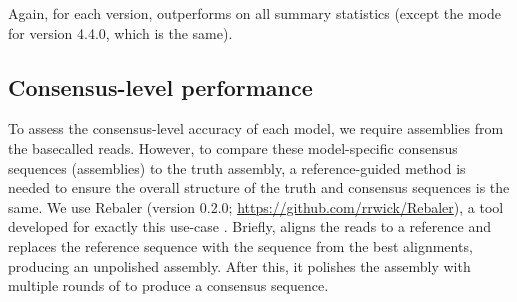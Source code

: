 Again, for each version, \tubby{} outperforms \guppy{} on all summary statistics (except the mode for version 4.4.0, which is the same).

\begin{table}
\centering
{}
\caption{Read BLAST identity summary statistics for the \mtb{}-specific basecalling model \tubby{} compared with the default \guppy{} model on the test data. Version indicates the \guppy{} version used for the basecalling before and after training. BLAST identity is the number of matching bases in a read alignment divided by the length of the alignment. Count refers to the number of reads evaluated. std=standard deviation.}
\label{tab:test-read-blast}
\end{table}

\subsection{Consensus-level performance}

To assess the consensus-level accuracy of each model, we require assemblies from the basecalled reads. However, to compare these model-specific consensus sequences (assemblies) to the truth assembly, a reference-guided method is needed to ensure the overall structure of the truth and consensus sequences is the same. We use Rebaler (version 0.2.0; \url{https://github.com/rrwick/Rebaler}), a tool developed for exactly this use-case \cite{wick2019}. Briefly,  aligns the reads to a reference and replaces the reference sequence with the sequence from the best alignments, producing an unpolished assembly. After this, it polishes the assembly with multiple rounds of  to produce a consensus sequence. 

